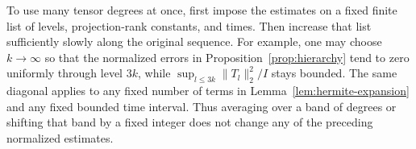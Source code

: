 To use many tensor degrees at once, first impose the estimates on a
fixed finite list of levels, projection-rank constants, and times.
Then increase that list sufficiently slowly along the original sequence.
For example, one may choose $k\to\infty$ so that the normalized errors
in Proposition~\ref{prop:hierarchy} tend to zero uniformly through
level $3k$, while $\sup_{l\le3k}\|T_l\|_2^2/I$ stays bounded.
The same diagonal applies to any fixed number of terms in
Lemma~\ref{lem:hermite-expansion} and any fixed bounded time interval.
Thus averaging over a band of degrees or shifting that band by a fixed
integer does not change any of the preceding normalized estimates.
